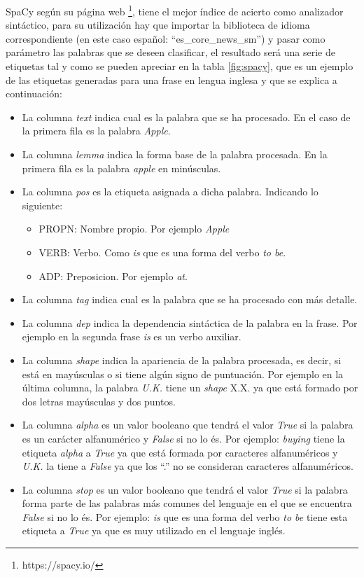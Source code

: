 SpaCy según su página web \footnote{https://spacy.io/}, tiene el mejor índice de acierto como analizador sintáctico, para su utilización hay que importar la biblioteca de idioma correspondiente (en este caso español: ``es\_core\_news\_sm'') y pasar como parámetro las palabras que se deseen clasificar, el resultado será una serie de etiquetas tal y como se pueden apreciar en la tabla \ref{fig:spacy}, que es un ejemplo de las etiquetas generadas para una frase en lengua inglesa y que se explica a continuación:
\begin{itemize}
	\item La columna \textit{text} indica cual es la palabra que se ha procesado. En el caso de la primera fila es la palabra \textit{Apple}.
	\item La columna \textit{lemma} indica la forma base de la palabra procesada. En la primera fila es la palabra \textit{apple} en minúsculas.
	\item La columna \textit{pos} es la etiqueta asignada a dicha palabra. Indicando lo siguiente:
		\begin{itemize}
			\item PROPN: Nombre propio. Por ejemplo \textit{Apple}
			\item VERB: Verbo. Como \textit{is} que es una forma del verbo \textit{to be}.
			\item ADP: Preposicion. Por ejemplo \textit{at}.
		\end{itemize}
	
	\item La columna \textit{tag} indica cual es la palabra que se ha procesado con más detalle.
	\item La columna \textit{dep} indica la dependencia sintáctica de la palabra en la frase. Por ejemplo en la segunda frase \textit{is} es un verbo auxiliar.
	\item La columna \textit{shape} indica la apariencia de la palabra procesada, es decir, si está en mayúsculas o si tiene algún signo de puntuación. Por ejemplo en la última columna, la palabra \textit{U.K.} tiene un \textit{shape} X.X. ya que está formado por dos letras mayúsculas y dos puntos.
	\item La columna \textit{alpha} es un valor booleano que tendrá el valor \textit{True} si la palabra es un carácter alfanumérico y \textit{False} si no lo és. Por ejemplo: \textit{buying} tiene la etiqueta \textit{alpha} a \textit{True} ya que está formada por caracteres alfanuméricos y \textit{U.K.} la tiene a \textit{False} ya que los ``.'' no se consideran caracteres alfanuméricos.
	\item La columna \textit{stop} es un valor booleano que tendrá el valor \textit{True} si la palabra forma parte de las palabras más comunes del lenguaje en el que se encuentra \textit{False} si no lo és. Por ejemplo: \textit{is} que es una forma del verbo \textit{to be} tiene esta etiqueta a \textit{True} ya que es muy utilizado en el lenguaje inglés.
\end{itemize}



